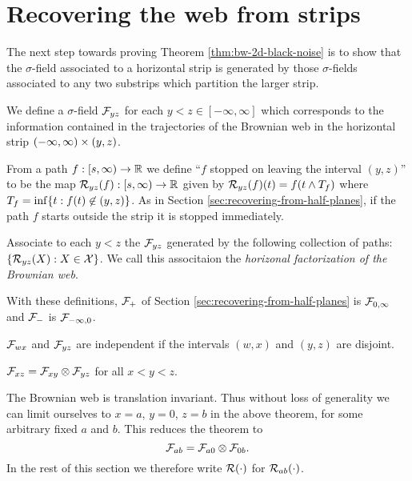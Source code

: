 {
\section{Recovering the web from strips}
\label{sec:recovering-from-strips}

The next step towards proving Theorem \ref{thm:bw-2d-black-noise} is
to show that the $\sigma$-field associated to a horizontal strip is
generated by those $\sigma$-fields associated to any two substrips
which partition the larger strip.

We define a $\sigma$-field $\mathcal{F}_{y z}$ for each $y < z \in
[-\infty, \infty]$ which corresponds to the information contained in
the trajectories of the Brownian web in the horizontal strip
$(-\infty, \infty) \times (y,z)$.

\begin{definition}
  \newcommand{\T}{\stripleavetime{f}}
  \label{def:restrict}
  From a path $f : [s, \infty) \to \mathbb{R}$ we define ``$f$ stopped on
    leaving the interval $(y,z)$'' to be the map $\mathcal{R}_{{y}{z}}(f) : [s,
      \infty) \to \mathbb{R}$ given by $\restrict{y}{z}{f}(t) = f(t \minsym \T)$
      where $\T = \inf\{ t : f(t) \not\in (y,z) \}$.
  As in Section \ref{sec:recovering-from-half-planes}, if the path $f$ starts
  outside the strip it is stopped immediately.

  \label{def:horizontal-factorization}
  Associate to each $y < z$ the \sigfield{}
  $\mathcal{F}_{y z}$ generated by the following collection of paths: $\{
  \mathcal{R}_{{y}{z}}(X) : X \in \mathcal{X} \}$.  We call this
  associtaion the \emph{horizonal factorization of the Brownian web}.
\end{definition}

With these definitions, $\mathcal{F}_{+}$ of Section \ref{sec:recovering-from-half-planes} is
$\mathcal{F}_{0,\infty}$ and $\mathcal{F}_{-}$ is
$\mathcal{F}_{-\infty,0}$.

\begin{observation}
  $\mathcal{F}_{w x}$ and $\mathcal{F}_{y z}$ are independent if the
  intervals $(w,x)$ and $(y,z)$ are disjoint.
\end{observation}

\renewcommand{\top}{b}
\newcommand{\bottom}{a}

\begin{theorem}\label{thm:recoveringfromstrips}
  $\mathcal{F}_{x z} = \mathcal{F}_{x y} \otimes \mathcal{F}_{y z}$ for all $x < y < z$.
\end{theorem}

The Brownian web is translation invariant.  Thus without loss of
generality we can limit ourselves to $x=a$, $y=0$, $z=b$ in the above
theorem, for some arbitrary fixed $a$ and $b$.  This reduces the theorem to
\[
\mathcal{F}_{a b} = \mathcal{F}_{a 0} \otimes \mathcal{F}_{0 b}.
\]
In the rest of this
section we therefore write $\mathcal{R}(\cdot)$ for
$\restrict{\bottom}{\top}{\cdot}$.

}
